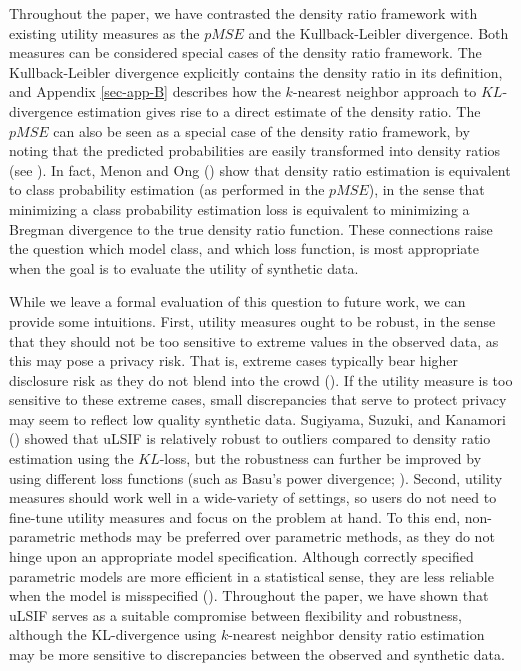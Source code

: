 \documentclass[
]{article}
\begin{document}
Throughout the paper, we have contrasted the density ratio framework
with existing utility measures as the \(pMSE\) and the Kullback-Leibler
divergence. Both measures can be considered special cases of the density
ratio framework. The Kullback-Leibler divergence explicitly contains the
density ratio in its definition, and Appendix \ref{sec-app-B} describes
how the \(k\)-nearest neighbor approach to \(KL\)-divergence estimation
gives rise to a direct estimate of the density ratio. The \(pMSE\) can
also be seen as a special case of the density ratio framework, by noting
that the predicted probabilities are easily transformed into density
ratios (see ). In fact, Menon and Ong
() show that density ratio
estimation is equivalent to class probability estimation (as performed
in the \(pMSE\)), in the sense that minimizing a class probability
estimation loss is equivalent to minimizing a Bregman divergence to the
true density ratio function. These connections raise the question which
model class, and which loss function, is most appropriate when the goal
is to evaluate the utility of synthetic data.

While we leave a formal evaluation of this question to future work, we
can provide some intuitions. First, utility measures ought to be robust,
in the sense that they should not be too sensitive to extreme values in
the observed data, as this may pose a privacy risk. That is, extreme
cases typically bear higher disclosure risk as they do not blend into
the crowd (). If the
utility measure is too sensitive to these extreme cases, small
discrepancies that serve to protect privacy may seem to reflect low
quality synthetic data. Sugiyama, Suzuki, and Kanamori
() showed that uLSIF is
relatively robust to outliers compared to density ratio estimation using
the \(KL\)-loss, but the robustness can further be improved by using
different loss functions (such as Basu's power divergence;
). Second, utility
measures should work well in a wide-variety of settings, so users do not
need to fine-tune utility measures and focus on the problem at hand. To
this end, non-parametric methods may be preferred over parametric
methods, as they do not hinge upon an appropriate model specification.
Although correctly specified parametric models are more efficient in a
statistical sense, they are less reliable when the model is misspecified
(). Throughout the paper, we have shown that uLSIF serves
as a suitable compromise between flexibility and robustness, although
the KL-divergence using \(k\)-nearest neighbor density ratio estimation
may be more sensitive to discrepancies between the observed and
synthetic data.
\end{document}
